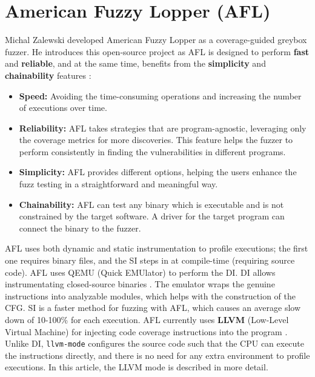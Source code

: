 \section{American Fuzzy Lopper (AFL)} \label{sec:2.2}

Michal Zalewski developed American Fuzzy Lopper as a coverage-guided greybox fuzzer. He introduces this open-source project as  \cite{zalewski2014american} AFL is designed to perform \textbf{fast} and \textbf{reliable}, and at the same time, benefits from the \textbf{simplicity} and \textbf{chainability} features \cite{about_afl}:

\begin{itemize}
    \item \textbf{Speed:} Avoiding the time-consuming operations and increasing the number of executions over time.
    \item \textbf{Reliability:} AFL takes strategies that are program-agnostic, leveraging only the coverage metrics for more discoveries. This feature helps the fuzzer to perform consistently in finding the vulnerabilities in different programs.
    \item \textbf{Simplicity:} AFL provides different options, helping the users enhance the fuzz testing in a straightforward and meaningful way. 
    \item \textbf{Chainability:} AFL can test any binary which is executable and is not constrained by the target software. A driver for the target program can connect the binary to the fuzzer.
\end{itemize}

AFL uses both dynamic and static instrumentation to profile executions; the first one requires binary files, and the SI steps in at compile-time (requiring source code). AFL uses QEMU (Quick EMUlator) to perform the DI. DI allows instrumentating closed-source binaries \cite{afl_qemu}. The emulator wraps the genuine instructions into analyzable modules, which helps with the construction of the CFG. SI is a faster method for fuzzing with AFL, which causes an average slow down of 10-100\% for each execution. AFL currently uses \textbf{LLVM} (Low-Level Virtual Machine) for injecting code coverage instructions into the program \cite{afl-llvm}. Unlike DI, \texttt{llvm-mode} configures the source code such that the CPU can execute the instructions directly, and there is no need for any extra environment to profile executions. In this article, the LLVM mode is described in more detail.

